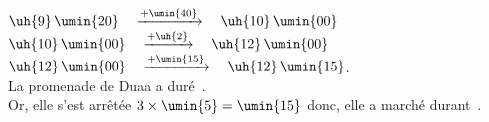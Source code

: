    $\uh{9}\,\umin{20} \quad \xrightarrow{+\umin{40}} \quad \uh{10}\,\umin{00}$ \\
   $\uh{10}\,\umin{00} \quad \xrightarrow{+\uh{2}} \quad \uh{12}\,\umin{00}$ \\
   $\uh{12}\,\umin{00}\quad \xrightarrow{+\umin{15}} \quad \uh{12}\,\umin{15}$. \\
   La promenade de Duaa a duré \,. \\
   Or, elle s'est arrêtée $3\times\umin{5} =\umin{15}$ donc, {\blue elle a marché durant \,}. \\
